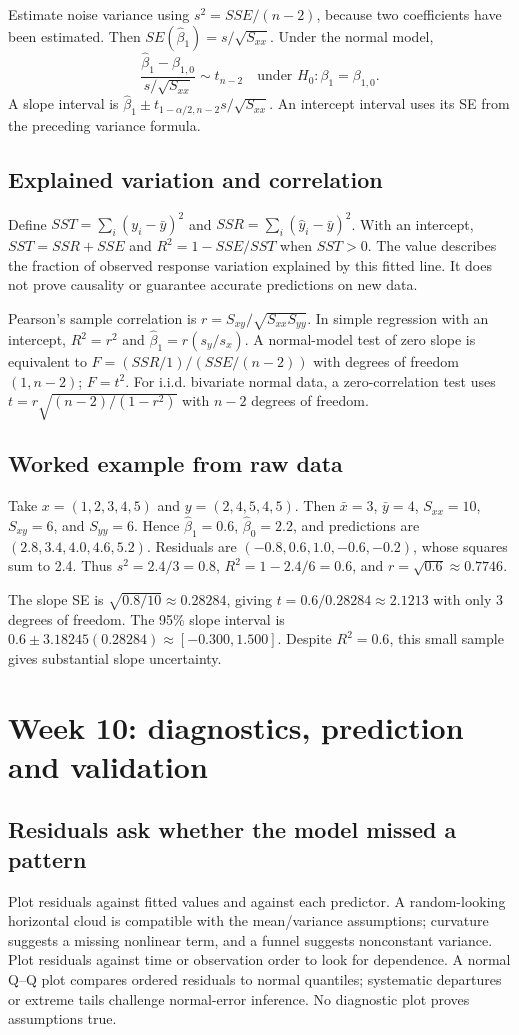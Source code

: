 Estimate noise variance using $s^2=SSE/(n-2)$, because two coefficients have
been estimated. Then $SE(\hat\beta_1)=s/\sqrt{S_{xx}}$. Under the normal model,
\[
\frac{\hat\beta_1-\beta_{1,0}}{s/\sqrt{S_{xx}}}\sim t_{n-2}
\quad\text{under }H_0:\beta_1=\beta_{1,0}.
\]
A slope interval is $\hat\beta_1\pm t_{1-\alpha/2,n-2}s/\sqrt{S_{xx}}$.
An intercept interval uses its SE from the preceding variance formula.

\subsection{Explained variation and correlation}
Define $SST=\sum_i(y_i-\bar y)^2$ and
$SSR=\sum_i(\hat y_i-\bar y)^2$. With an intercept,
$SST=SSR+SSE$ and $R^2=1-SSE/SST$ when $SST>0$.
The value describes the fraction of observed response variation explained
by this fitted line. It does not prove causality or guarantee accurate
predictions on new data.

Pearson's sample correlation is $r=S_{xy}/\sqrt{S_{xx}S_{yy}}$.
In simple regression with an intercept, $R^2=r^2$ and
$\hat\beta_1=r(s_y/s_x)$. A normal-model test of zero slope is equivalent
to $F=(SSR/1)/(SSE/(n-2))$ with degrees of freedom $(1,n-2)$; $F=t^2$.
For i.i.d. bivariate normal data, a zero-correlation test uses
$t=r\sqrt{(n-2)/(1-r^2)}$ with $n-2$ degrees of freedom.

\subsection{Worked example from raw data}
Take $x=(1,2,3,4,5)$ and $y=(2,4,5,4,5)$. Then
$\bar x=3$, $\bar y=4$, $S_{xx}=10$, $S_{xy}=6$, and $S_{yy}=6$.
Hence $\hat\beta_1=0.6$, $\hat\beta_0=2.2$, and predictions are
$(2.8,3.4,4.0,4.6,5.2)$. Residuals are
$(-0.8,0.6,1.0,-0.6,-0.2)$, whose squares sum to 2.4.
Thus $s^2=2.4/3=0.8$, $R^2=1-2.4/6=0.6$, and
$r=\sqrt{0.6}\approx0.7746$.

The slope SE is $\sqrt{0.8/10}\approx0.28284$, giving
$t=0.6/0.28284\approx2.1213$ with only 3 degrees of freedom.
The 95\% slope interval is
$0.6\pm3.18245(0.28284)\approx[-0.300,1.500]$.
Despite $R^2=0.6$, this small sample gives substantial slope uncertainty.

\clearpage
\section{Week 10: diagnostics, prediction and validation}
\subsection{Residuals ask whether the model missed a pattern}
Plot residuals against fitted values and against each predictor.
A random-looking horizontal cloud is compatible with the mean/variance
assumptions; curvature suggests a missing nonlinear term, and a funnel
suggests nonconstant variance. Plot residuals against time or observation
order to look for dependence. A normal Q--Q plot compares ordered residuals
to normal quantiles; systematic departures or extreme tails challenge
normal-error inference. No diagnostic plot proves assumptions true.

